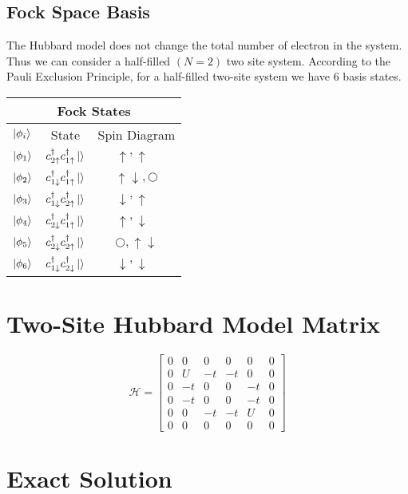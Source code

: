 \documentclass{article}
\begin{document}
\subsection{Fock Space Basis}
The Hubbard model does not change the total number of electron in the system. Thus we can consider
a half-filled $(N = 2)$ two site system. According to the Pauli Exclusion Principle, for a half-filled two-site system we
have 6 basis states.
\begin{center}
\begin{tabular} {lcc}
    \toprule
    \multicolumn{3}{c}{Fock States} \\
    \midrule
    $ \ket{\phi_{i}}$ & State & Spin Diagram \\\midrule
    $ \ket{\phi_{1}}$ & $c^{\dagger}_{2\uparrow}c^{\dagger}_{1\uparrow}\ket{} $   &   $ \uparrow ,\uparrow\text{\ } $\\ \midrule
    $ \ket{\phi_{2}}$ & $c^{\dagger}_{1\downarrow}c^{\dagger}_{1\uparrow}\ket{} $ &   $  \uparrow\downarrow,\bigcirc $\\ \midrule
    $ \ket{\phi_{3}}$ & $c^{\dagger}_{1\downarrow}c^{\dagger}_{2\uparrow}\ket{} $ &   $ \downarrow ,\uparrow \text{\ }$\\ \midrule
    $ \ket{\phi_{4}}$ & $c^{\dagger}_{2\downarrow}c^{\dagger}_{1\uparrow}\ket{} $ &   $ \uparrow ,\downarrow \text{\ }$\\ \midrule
    $ \ket{\phi_{5}}$ & $c^{\dagger}_{2\downarrow}c^{\dagger}_{2\uparrow}\ket{} $ &   $ \bigcirc,\uparrow\downarrow $\\ \midrule
    $ \ket{\phi_{6}}$ & $c^{\dagger}_{1\downarrow}c^{\dagger}_{2\downarrow}\ket{} $ & $ \downarrow,\downarrow\text{\ } $\\ \midrule
    \bottomrule
\end{tabular}
\end{center}
\section{Two-Site Hubbard Model Matrix}
\begin{equation}
  \mathcal{H} =
  \begin{bmatrix}
    0 & 0 & 0 & 0 & 0 & 0 \\
    0 & U & -t & -t & 0 & 0 \\
    0 & -t & 0 & 0 & -t & 0 \\
    0 & -t & 0 & 0 & -t & 0 \\
    0 & 0 & -t & -t & U & 0 \\
    0 & 0 & 0 & 0 & 0 & 0
  \end{bmatrix}
\end{equation}
\section{Exact Solution}
\end{document}
